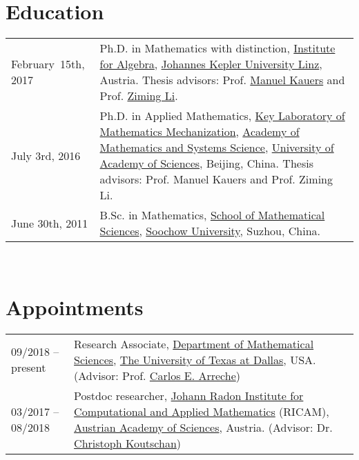 \documentclass[a4paper,12pt]{article}
\begin{document}

\section*{\Large{Education}}
\begin{tabular}{@{}p{1.5in}p{4in}}
February~15th, 2017   &  Ph.D. in Mathematics with distinction, 
                        \href{http://www.jku.at/algebra/content}{Institute for Algebra}, 
                        \href{http://www.jku.at/content}{Johannes Kepler University Linz}, Austria. 
                        Thesis advisors: Prof. \href{http://www.kauers.de/}{Manuel Kauers} and 
                        Prof. \href{http://mmrc.iss.ac.cn/~zmli/}{Ziming Li}. \\
July 3rd, 2016    & Ph.D. in Applied Mathematics, 
                        \href{http://english.mmrc.amss.cas.cn/}{Key Laboratory of Mathematics Mechanization}, 
                        \href{http://english.amss.cas.cn/}{Academy of Mathematics and Systems Science}, 
                        \href{http://english.ucas.ac.cn/}{University of Academy of Sciences}, Beijing, China. 
                       Thesis advisors: Prof. Manuel Kauers and Prof. Ziming Li.\\
June 30th, 2011    & B.Sc. in Mathematics, \href{http://math.suda.edu.cn/}{School of Mathematical Sciences}, 
                        \href{http://eng.suda.edu.cn/}{Soochow University}, Suzhou, China.  
\end{tabular} \\

\section*{\Large{Appointments}}
\begin{tabular}{@{}p{1.4in}p{4in}}
09/2018 -- present      & Research Associate, \href{https://www.utdallas.edu/math/}{Department of Mathematical Sciences}, 
                        \href{https://www.utdallas.edu/}{The University of Texas at Dallas}, USA. 
                        (Advisor: Prof. \href{https://www.utdallas.edu/~arreche/}{Carlos E. Arreche}) \\    
03/2017 -- 08/2018    & Postdoc researcher, 
                        \href{https://www.ricam.oeaw.ac.at/}{Johann Radon Institute for Computational and Applied Mathematics} (RICAM),
                        \href{http://www.oeaw.ac.at/en/austrian-academy-of-sciences/}{Austrian Academy of Sciences}, Austria. 
                        (Advisor: Dr. \href{http://www.koutschan.de/}{Christoph Koutschan})\\
\end{tabular}
\end{document}
